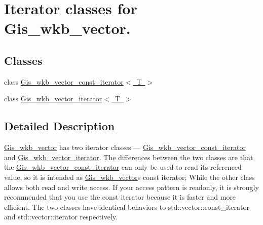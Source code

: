 \hypertarget{group__Gis__wkb__vector__iterators}{}\section{Iterator classes for Gis\+\_\+wkb\+\_\+vector.}
\label{group__Gis__wkb__vector__iterators}
\subsection*{Classes}
\begin{DoxyCompactItemize}
\item 
class \mbox{\hyperlink{classGis__wkb__vector__const__iterator}{Gis\+\_\+wkb\+\_\+vector\+\_\+const\+\_\+iterator$<$ T $>$}}
\item 
class \mbox{\hyperlink{classGis__wkb__vector__iterator}{Gis\+\_\+wkb\+\_\+vector\+\_\+iterator$<$ T $>$}}
\end{DoxyCompactItemize}


\subsection{Detailed Description}
\mbox{\hyperlink{classGis__wkb__vector}{Gis\+\_\+wkb\+\_\+vector}} has two iterator classes --- \mbox{\hyperlink{classGis__wkb__vector__const__iterator}{Gis\+\_\+wkb\+\_\+vector\+\_\+const\+\_\+iterator}} and \mbox{\hyperlink{classGis__wkb__vector__iterator}{Gis\+\_\+wkb\+\_\+vector\+\_\+iterator}}. The differences between the two classes are that the \mbox{\hyperlink{classGis__wkb__vector__const__iterator}{Gis\+\_\+wkb\+\_\+vector\+\_\+const\+\_\+iterator}} can only be used to read its referenced value, so it is intended as \mbox{\hyperlink{classGis__wkb__vector}{Gis\+\_\+wkb\+\_\+vector}}\textquotesingle{}s const iterator; While the other class allows both read and write access. If your access pattern is readonly, it is strongly recommended that you use the const iterator because it is faster and more efficient. The two classes have identical behaviors to std\+::vector\+::const\+\_\+iterator and std\+::vector\+::iterator respectively. 